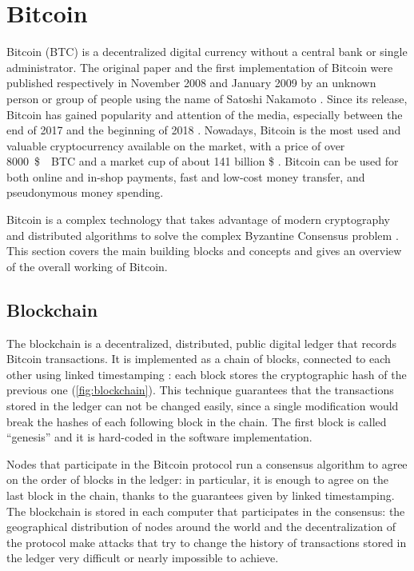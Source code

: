 \chapter{Bitcoin}
\label{chapter:bitcoin}
Bitcoin (BTC) is a decentralized digital currency without a central bank or single administrator.
The original paper \cite{bitcoin_2009} and the first implementation of Bitcoin were published respectively in November \num{2008} and January \num{2009} by an unknown person or group of people using the name of Satoshi Nakamoto \cite{bitcoin_website}.
Since its release, Bitcoin has gained popularity and attention of the media, especially between the end of \num{2017} and the beginning of \num{2018} \cite{bbc_2018, telegraph_2018, ilsole24ore_2018}.
Nowadays, Bitcoin is the most used and valuable cryptocurrency available on the market, with a price of over \SI{8000}{\$ \per BTC} and a market cup of about \num{141} billion \$ \cite{bitcoin_usage_study_2017, stats_coinmarketcap, stats_coinranking, stats_cryptocompare, stats_coincheckup, stats_moonstats}.
Bitcoin can be used for both online and in-shop payments, fast and low-cost money transfer, and pseudonymous money spending.

\bigskip
Bitcoin is a complex technology that takes advantage of modern cryptography and distributed algorithms to solve the complex Byzantine Consensus problem \cite{byzantin_generals_1982}.
This section covers the main building blocks and concepts and gives an overview of the overall working of Bitcoin.

\section{Blockchain}
The blockchain is a decentralized, distributed, public digital ledger that records Bitcoin transactions.
It is implemented as a chain of blocks, connected to each other using linked timestamping \cite{bitcoin_book_narayanan_2016, hash_function_wikipedia}:
each block stores the cryptographic hash of the previous one (\cref{fig:blockchain}).
This technique guarantees that the transactions stored in the ledger can not be changed easily, since a single modification would break the hashes of each following block in the chain.
The first block is called ``genesis'' and it is hard-coded in the software implementation.

Nodes that participate in the Bitcoin protocol run a consensus algorithm to agree on the order of blocks in the ledger:
in particular, it is enough to agree on the last block in the chain, thanks to the guarantees given by linked timestamping.
The blockchain is stored in each computer that participates in the consensus:
the geographical distribution of nodes around the world and the decentralization of the protocol make attacks that try to change the history of transactions stored in the ledger very difficult or nearly impossible to achieve.

